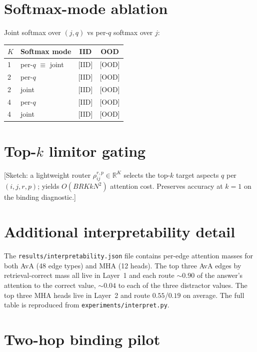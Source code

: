 \documentclass{article}
\newcommand{\R}{\mathbb{R}}
\begin{document}
\section{Softmax-mode ablation}
\label{app:softmax-ablation}

Joint softmax over $(j, q)$ vs per-$q$ softmax over $j$:

\begin{center}
\begin{tabular}{llcc}
\toprule
$K$ & Softmax mode & IID & OOD \\
\midrule
1 & per-$q$ $\equiv$ joint         & \textsc{[IID]} & \textsc{[OOD]} \\
2 & per-$q$                         & \textsc{[IID]} & \textsc{[OOD]} \\
2 & joint                           & \textsc{[IID]} & \textsc{[OOD]} \\
4 & per-$q$                         & \textsc{[IID]} & \textsc{[OOD]} \\
4 & joint                           & \textsc{[IID]} & \textsc{[OOD]} \\
\bottomrule
\end{tabular}
\end{center}

\section{Top-$k$ limitor gating}
\label{app:topk}

[Sketch: a lightweight router $\rho^{r,p}_{ij} \in \R^K$ selects the
top-$k$ target aspects $q$ per $(i, j, r, p)$; yields $O(B R K k N^2)$
attention cost. Preserves accuracy at $k{=}1$ on the binding
diagnostic.]

\section{Additional interpretability detail}
\label{app:interp}

The \texttt{results/interpretability.json} file contains per-edge
attention masses for both AvA (48 edge types) and MHA (12 heads). The
top three AvA edges by retrieval-correct mass all live in Layer~1 and
each route ${\sim}0.90$ of the answer's attention to the correct
value, ${\sim}0.04$ to each of the three distractor values. The top
three MHA heads live in Layer~2 and route $0.55$/$0.19$ on average.
The full table is reproduced from
\texttt{experiments/interpret.py}.

\section{Two-hop binding pilot}
\label{app:multihop}
\end{document}
